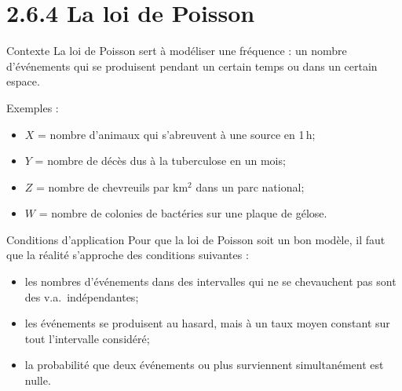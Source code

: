 \documentclass{BeamerTemplate}
\begin{document}
\section[Loi de Poisson]{2.6.4 La loi de Poisson}

\begin{frame}[t]{Contexte}
  La loi de Poisson sert à modéliser une \alert{fréquence} : un nombre
  d'événements qui se produisent pendant un certain temps ou dans un certain
  espace.

  \medskip
  Exemples :
  \begin{itemize}\small
    \item $X$ = nombre d'animaux qui s'abreuvent à une source en 1\,h;
    \item $Y$ = nombre de décès dus à la tuberculose en un mois;
    \item $Z$ = nombre de chevreuils par km$^2$ dans un parc national;
    \item $W$ = nombre de colonies de bactéries sur une plaque de gélose.
  \end{itemize}

\end{frame}

\begin{frame}[t]{Conditions d'application}
  Pour que la loi de Poisson soit un bon modèle, il faut que la réalité
  s'approche des conditions suivantes :
  \begin{itemize}\itemsep 3mm
    \item les nombres d'événements dans des intervalles qui ne se chevauchent
      pas sont des v.a.\ \alert{indépendantes};
    \item les événements se produisent au hasard, mais à un \alert{taux moyen
      constant} sur tout l'intervalle considéré;
    \item la probabilité que deux événements ou plus surviennent
      \alert{simultanément} est nulle.
  \end{itemize}
\end{frame}
\end{document}
